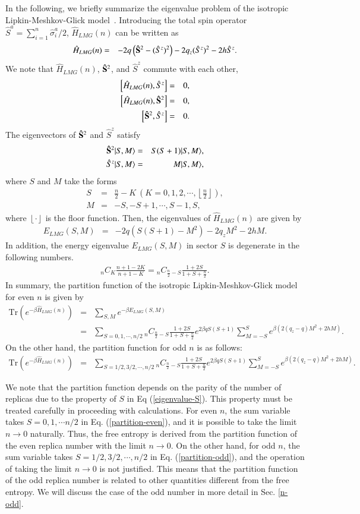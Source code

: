 \documentclass[
aps,
pre,
showpacs
]{revtex4-1}
\newcommand{\be}{\begin{eqnarray}}
\newcommand{\ee}{\end{eqnarray}}
\newcommand{\no}{\nonumber}
\newcommand{\Tr}{\mbox{Tr} }
\begin{document}
In the following, we briefly summarize the eigenvalue problem of the isotropic Lipkin-Meshkov-Glick model~\cite{CFLRT}.
Introducing the total spin operator $\hat{S}^a=\sum_{i=1}^n \hat{\sigma}_i^a/2$, $\hat{H}_{LMG}(n)$ can be written as
\be
\hat{H}_{LMG}(n)&=&  - 2q\left( {\bf \hat{S}}^2 - (\hat{S}^z)^2 \right)- 2q_z (\hat{S}^z)^2-2 h \hat{S}^z.
\ee
We note that $\hat{H}_{LMG}(n)$, ${\bf \hat{S}}^2$, and $\hat{S}^z$ commute with each other,
\be
\left[\hat{H}_{LMG}(n) , \hat{S}^z \right]&=&0,
\\
\left[\hat{H}_{LMG}(n), {\bf \hat{S}}^2 \right]&=&0,
\\
\left[{\bf \hat{S}}^2 , \hat{S}^z \right]&=&0.
\ee
The eigenvectors of ${\bf \hat{S}}^2$ and $\hat{S}^z$ satisfy
\be
{\bf \hat{S}}^2 |S,M \rangle&=&S(S+1)|S,M \rangle ,
\\
\hat{S}^z |S,M \rangle&=&M|S,M \rangle ,
\ee
where $S$ and $M$ take the forms 
\be
S&=& \frac{n}{2}-K \   \left(K=0,1,2,\cdots, \left\lfloor \frac{n}{2} \right\rfloor \right) , \label{eigenvalue-S}
\\
M&=&-S,-S+1,\cdots, S-1, S ,
\ee
where $\left\lfloor \cdot \right\rfloor$ is the floor function.
Then, the eigenvalues of $\hat{H}_{LMG}(n)$ are given by
\be
E_{LMG}(S,M)&=&  - 2q\left( S(S+1) - M^2 \right)- 2q_z M^2-2 h M.
\ee
In addition, the energy eigenvalue $E_{LMG}(S,M)$ in sector $S$ is degenerate in the following numbers.
\be
 {}_n C _K \frac{n+1-2K}{n+1-K}= {}_n C _{\frac{n}{2}-S} \frac{1+2S}{1+S+\frac{n}{2}} .
\ee
In summary, the partition function of the isotropic Lipkin-Meshkov-Glick model for even $n$ is given by 
\be
\Tr\left( e^{-\beta\hat{H}_{LMG}(n)  }\right)&=&\sum_{S,M}e^{-\beta E_{LMG}(S,M)  } 
\no\\
&=&\sum_{S=0,1,\cdots,n/2}{}_n C _{\frac{n}{2}-S} \frac{1+2S}{1+S+\frac{n}{2}} e^{ 2\beta q S(S+1)}  \sum_{M=-S}^S  e^{ \beta\left(   2(q_z-q) M^2+2 h M \right)}.
\label{partition-even}
\ee
On the other hand, the partition function for odd $n$ is as follows:
\be
\Tr\left( e^{-\beta\hat{H}_{LMG}(n)  }\right)&=&\sum_{S=1/2,3/2,\cdots,n/2}^{} {}_n C _{\frac{n}{2}-S} \frac{1+2S}{1+S+\frac{n}{2}} e^{ 2\beta q S(S+1)}  \sum_{M=-S}^S  e^{ \beta\left(   2(q_z-q) M^2+2 h M \right)} .\label{partition-odd}
\ee

We note that the partition function depends on the parity of the number of replicas due to the property of $S$ in Eq (\ref{eigenvalue-S}).
This property must be treated carefully in proceeding with calculations.
For even $n$, the sum variable takes $S=0,1,\cdots n/2$ in Eq. (\ref{partition-even}), and it is possible to take the limit $n\to0$ naturally.
Thus, the free entropy is derived from the partition function of the even replica number with the limit $n\to0$.
On the other hand, for odd $n$, the sum variable takes $S=1/2,3/2,\cdots,n/2$ in Eq. (\ref{partition-odd}), and the operation of taking the limit $n\to0$ is not justified.
This means that the partition function of the odd replica number is related to other quantities different from the free entropy.
We will discuss the case of the odd number in more detail in Sec. \ref{n-odd}.
\end{document}
